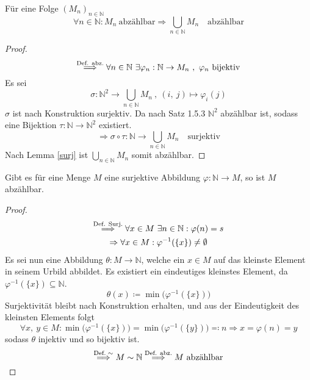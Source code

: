 \documentclass{anablatt}
\begin{document}
\begin{theorem}
Für eine Folge $(M_n)_{n \in \mathbb{N}}$
	\[ \forall n \in \mathbb{N} : M_n\ \text{abzählbar} \Rightarrow \bigcup_{n \in \mathbb{N}}M_n\quad\text{abzählbar}\]
\end{theorem}
\begin{proof}
\[ \txtimpl{Def. abz.} \forall n \in \mathbb{N}\ \exists \varphi_n:\mathbb{N} \rightarrow M_n\ ,\ \varphi_n\ \text{bijektiv} \]
Es sei
\[ \sigma : \mathbb{N}^2 \rightarrow \bigcup_{n \in \mathbb{N}}M_n\ ,\ (i,\ j) \mapsto \varphi_i(j) \]
$\sigma$ ist nach Konstruktion surjektiv. Da nach Satz 1.5.3 $\mathbb{N}^2$ abzählbar ist, sodass eine Bijektion $\tau : \mathbb{N} \rightarrow \mathbb{N}^2$ existiert.
\[ \Rightarrow \sigma \circ \tau : \mathbb{N} \rightarrow \bigcup_{n \in \mathbb{N}}M_n \quad \text{surjektiv} \]
Nach Lemma \ref{surj} ist $\bigcup_{n \in \mathbb{N}}M_n$ somit abzählbar.
\end{proof}

\begin{lemma}\label{surj}
	Gibt es für eine Menge $M$ eine surjektive Abbildung $\varphi:\mathbb{N} \rightarrow M$, so ist $M$ abzählbar.	
\end{lemma}
\begin{proof}
\begin{gather*}
	\stackrel{\text{Def. Surj.}}{\Longrightarrow} \forall x \in M \ \exists n \in \mathbb{N} : \varphi(n) = s \\
	\Rightarrow \forall x \in M : \varphi^{-1}(\{x\}) \neq \emptyset
\end{gather*}
Es sei nun eine Abbildung $\theta: M \rightarrow \mathbb{N}$, welche ein $x \in M$ auf das kleinste Element in seinem Urbild abbildet. Es existiert ein eindeutiges kleinstes Element, da $\varphi^{-1}(\{x\}) \subseteq \mathbb{N}$.
\[ \theta(x) \coloneqq \min\big(\varphi^{-1}(\{x\})\big) \]
Surjektivität bleibt nach Konstruktion erhalten, und aus der Eindeutigkeit des kleinsten Elements folgt
\[ \forall x,\ y \in M : \min\big(\varphi^{-1}(\{x\})\big) = \min\big(\varphi^{-1}(\{y\})\big) \eqqcolon n \Rightarrow x = \varphi(n) = y\]
sodass $\theta$ injektiv und so bijektiv ist.
\[ \stackrel{\text{Def.}\;\sim}{\Longrightarrow} M \sim \mathbb{N} \stackrel{\text{Def. abz.}}{\Longrightarrow} M\ \text{abzählbar} \]
\end{proof}
\end{document}
